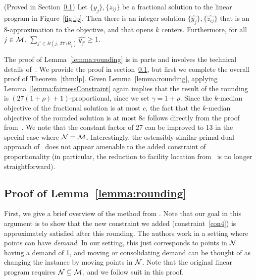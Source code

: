\begin{lemma} (Proved in Section~\ref{sec:lemmaProof})
\label{lemma:rounding}
Let $\{y_j\}, \{z_{ij}\}$ be a fractional solution to the linear program in Figure~\ref{fig:lp}. Then there is an integer solution $\{\hat{y_j}\}, \{ \hat{z_{ij}}\}$ that is an $8$-approximation to the objective, and that opens $k$ centers. Furthermore, for all $j \in \mathcal{M}$, $\sum_{j' \in B(j, \, 27 \gamma R_j)} \hat{y_{j'}} \geq 1$.
\end{lemma}

The proof of Lemma~\ref{lemma:rounding} is in parts and involves the technical details of~\cite{kMedianLP}. We provide the proof in section~\ref{sec:lemmaProof}, but first we complete the overall proof of Theorem~\ref{thm:lp}. Given Lemma~\ref{lemma:rounding}, applying Lemma~\ref{lemma:fairnessConstraint} again implies that the result of the rounding is $(27(1+\rho)+1)$-proportional, since we set $\gamma = 1+\rho$. Since the $k$-median objective of the fractional solution is at most $c$, the fact that the $k$-median objective of the rounded solution is at most $8c$ follows directly from the proof from~\cite{kMedianLP}. We note that the constant factor of 27 can be improved to 13 in the special case where $\mathcal {N} = \mathcal{M}$. Interestingly, the ostensibly similar primal-dual approach of~\cite{kMedianPrimalDual} does not appear amenable to the added constraint of proportionality (in particular, the reduction to facility location from~\cite{kMedianPrimalDual} is no longer straightforward).    


\subsection{Proof of Lemma~\ref{lemma:rounding}}
\label{sec:lemmaProof}

First, we give a brief overview of the method from \cite{kMedianLP}. Note that our goal in this argument is to show that the new constraint we added (constraint~\ref{con4}) is approximately satisfied after this rounding. The authors work in a setting where points can have \textit{demand}. In our setting, this just corresponds to points in $\mathcal {N}$ having a demand of 1, and moving or consolidating demand can be thought of as changing the instance by moving points in $\mathcal {N}$. Note that the original linear program requires $\mathcal {N} \subseteq \mathcal{M}$, and we follow suit in this proof. 

